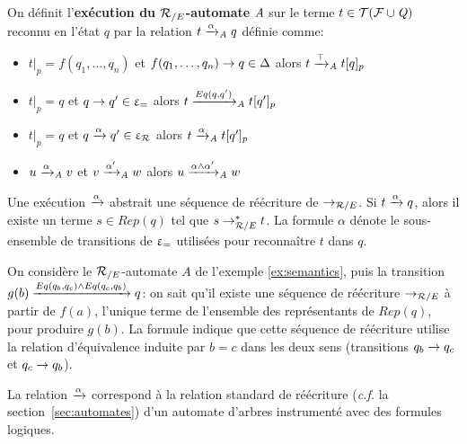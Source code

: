 
\begin{definition}
  \label{def:xrw_alpha}
  On définit l'\textbf{exécution du ${\mathcal R_{/E}}$-automate} $\mathit A$ sur le terme $t \in \mathcal{ T(F \cup \mathit Q)}$ reconnu en l'état $q$ 
  par la relation $t \xrightarrow{\alpha}_\mathit A q$ définie comme:
  \begin{itemize}
  \item $t|_p = f(q_1, \dots, q_n)$ et $f(q_1, \dots, q_n) \rightarrow q \in \Delta$
    alors $t \xrightarrow{\top}_\mathit A t[q]_p$
  \item $t|_p = q$ et $q \rightarrow q' \in \upvarepsilon_{=}$ alors $t \xrightarrow{Eq(q, q')}_\mathit A t[q']_p$
  \item $t|_p = q$ et $q \xrightarrow{\alpha} q' \in \upvarepsilon_{\mathcal R}$ alors $t \xrightarrow{\alpha}_\mathit A t[q']_p$ 
  \item $u \xrightarrow{\alpha}_\mathit A v$ et  $v \xrightarrow{\alpha'}_\mathit A w$ alors $u \xrightarrow{\alpha \land \alpha'}_\mathit A w$
  \end{itemize}
\end{definition}

\noindent
Une exécution $\xrightarrow{\alpha}$ abstrait une séquence de réécriture de $\rightarrow_{\mathcal R/E}$. Si $t
\xrightarrow{\alpha} q$, alors il existe un terme $s\in Rep(q)$ tel que 
$s\rightarrow_{\mathcal R/E}^* t$. La formule  $\alpha$ dénote le sous-ensemble de transitions de $\upvarepsilon_{=}$ 
utilisées pour reconnaître $t$ dans $q$.


\begin{example}
  On considère le ${\mathcal R_{/E}}$-automate $A$ de l'exemple \ref{ex:semantics}, puis la transition
  $g(b) \xrightarrow{Eq(q_b, q_c) \land Eq (q_c, q_b)} q$: on sait qu'il existe 
  une séquence de réécriture $\rightarrow_{\mathcal R/E}$ à partir de $f(a)$, l'unique terme
  de l'ensemble des représentants de  $Rep(q)$, pour produire $g(b)$. 
  La formule indique que cette séquence de réécriture utilise 
  la relation d'équivalence  induite par $b = c$ dans les deux sens
  (transitions $q_b \rightarrow q_c$ et $q_c \rightarrow q_b$).
\end{example}


La relation $\xrightarrow{\alpha}$ correspond à la relation standard de réécriture 
(\textit{c.f.} la section~\ref{sec:automates}) d'un automate d'arbres instrumenté avec
des formules logiques.

